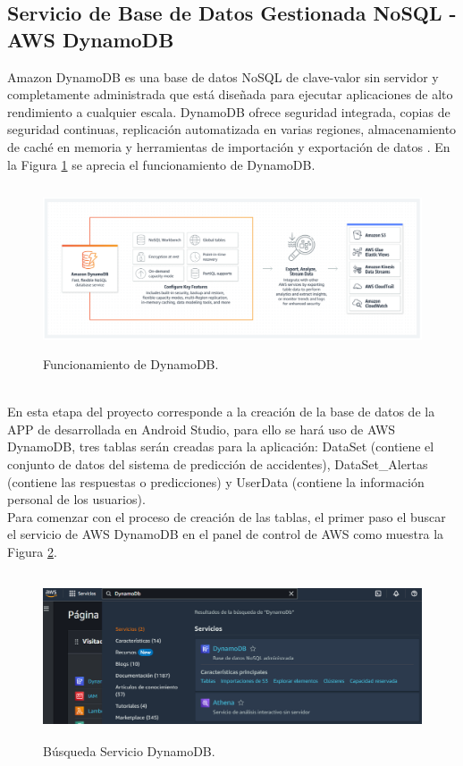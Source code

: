 \documentclass[a4paper,10pt, oneside, titlepage]{article}
\begin{document}
	\subsection{Servicio de Base de Datos Gestionada NoSQL - AWS DynamoDB}\label{DynamoDB_AWS_SQL}
	Amazon DynamoDB es una base de datos NoSQL de clave-valor sin servidor y completamente administrada que está diseñada para ejecutar aplicaciones de alto rendimiento a cualquier escala. DynamoDB ofrece seguridad integrada, copias de seguridad continuas, replicación automatizada en varias regiones, almacenamiento de caché en memoria y herramientas de importación y exportación de datos \cite{DynamoDB}. En la Figura \ref{Funcionamiento_DynamoDB} se aprecia el funcionamiento de DynamoDB.
	\begin{figure}[!h]
		\centering
		\includegraphics[width = 1\linewidth, height = 4.9cm]{Funcionamiento_DynamoDB.png}
		\caption{Funcionamiento de DynamoDB.}
		\label{Funcionamiento_DynamoDB}
	\end{figure} \\
	\indent En esta etapa del proyecto corresponde a la creación de la base de datos de la APP de desarrollada en Android Studio, para ello se hará uso de AWS DynamoDB, tres tablas serán creadas para la aplicación: DataSet (contiene el conjunto de datos del sistema de predicción de accidentes), DataSet\_Alertas (contiene las respuestas o predicciones) y UserData (contiene la información personal de los usuarios). \\\newline
	\indent Para comenzar con el proceso de creación de las tablas, el primer paso el buscar el servicio de AWS DynamoDB en el panel de control de AWS como muestra la Figura \ref{Servicio_DynamoDB}.
	\begin{figure}[!h]
		\centering
		\includegraphics[width = 1\linewidth, height = 4.9cm]{Servicio_DynamoDB.png}
		\caption{Búsqueda Servicio DynamoDB.}
		\label{Servicio_DynamoDB}
	\end{figure} \\
\end{document}
